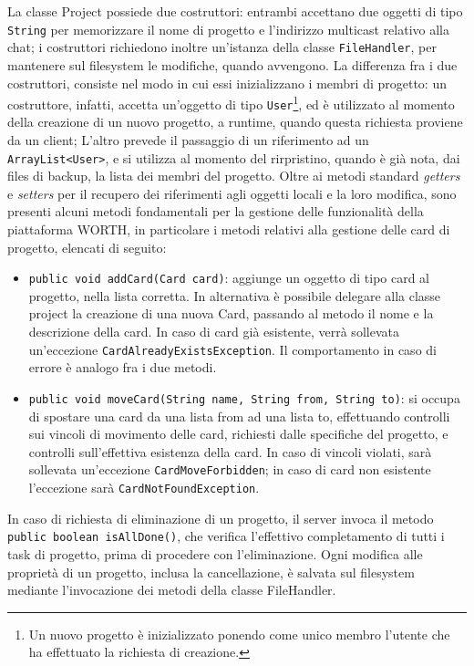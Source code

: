 \documentclass{article}
\begin{document}
La classe Project possiede due costruttori: entrambi accettano due oggetti di tipo \texttt{String} per memorizzare il nome di progetto e l'indirizzo multicast relativo alla chat; i costruttori richiedono inoltre un'istanza della classe \texttt{FileHandler}, per mantenere sul filesystem le modifiche, quando avvengono. La differenza fra i due costruttori, consiste nel modo in cui essi inizializzano i membri di progetto: un costruttore, infatti, accetta un'oggetto di tipo \texttt{User}\footnote{Un nuovo progetto è inizializzato ponendo come unico membro l'utente che ha effettuato la richiesta di creazione.}, ed è utilizzato al momento della creazione di un nuovo progetto, a runtime, quando questa richiesta proviene da un client; L'altro prevede il passaggio di un riferimento ad un \texttt{ArrayList<User>}, e si utilizza al momento del rirpristino, quando è già nota, dai files di backup, la lista dei membri del progetto.
Oltre ai metodi standard \emph{getters} e \emph{setters} per il recupero dei riferimenti agli oggetti locali e la loro modifica, sono presenti alcuni metodi fondamentali per la gestione delle funzionalità della piattaforma WORTH, in particolare i metodi relativi alla gestione delle card di progetto, elencati di seguito:
\begin{itemize}
    \item \texttt{public void addCard(Card card)}: aggiunge un oggetto di tipo card al progetto, nella lista corretta. In alternativa è possibile delegare alla classe project la creazione di una nuova Card, passando al metodo il nome e la descrizione della card. In caso di card già esistente, verrà sollevata un'eccezione \texttt{CardAlreadyExistsException}. Il comportamento in caso di errore è analogo fra i due metodi.
    \item \texttt{public void moveCard(String name, String from, String to)}: si occupa di spostare una card da una lista from ad una lista to, effettuando controlli sui vincoli di movimento delle card, richiesti dalle specifiche del progetto, e controlli sull'effettiva esistenza della card. In caso di vincoli violati, sarà sollevata un'eccezione \texttt{CardMoveForbidden}; in caso di card non esistente l'eccezione sarà \texttt{CardNotFoundException}.
\end{itemize}
In caso di richiesta di eliminazione di un progetto, il server invoca il metodo \texttt{public boolean isAllDone()}, che verifica l'effettivo completamento di tutti i task di progetto, prima di procedere con l'eliminazione.
Ogni modifica alle proprietà di un progetto, inclusa la cancellazione, è salvata sul filesystem mediante l'invocazione dei metodi della classe FileHandler.
\end{document}
